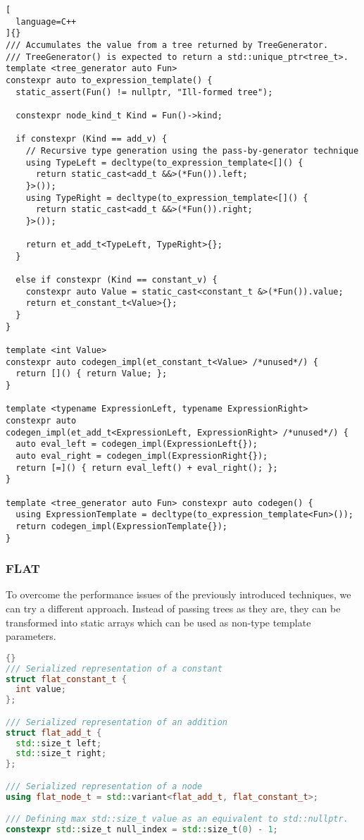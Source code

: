 \documentclass[../main]{subfiles}
\begin{document}
\begin{lstlisting}[
  language=C++
]{}
/// Accumulates the value from a tree returned by TreeGenerator.
/// TreeGenerator() is expected to return a std::unique_ptr<tree_t>.
template <tree_generator auto Fun>
constexpr auto to_expression_template() {
  static_assert(Fun() != nullptr, "Ill-formed tree");

  constexpr node_kind_t Kind = Fun()->kind;

  if constexpr (Kind == add_v) {
    // Recursive type generation using the pass-by-generator technique
    using TypeLeft = decltype(to_expression_template<[]() {
      return static_cast<add_t &&>(*Fun()).left;
    }>());
    using TypeRight = decltype(to_expression_template<[]() {
      return static_cast<add_t &&>(*Fun()).right;
    }>());

    return et_add_t<TypeLeft, TypeRight>{};
  }

  else if constexpr (Kind == constant_v) {
    constexpr auto Value = static_cast<constant_t &>(*Fun()).value;
    return et_constant_t<Value>{};
  }
}

template <int Value>
constexpr auto codegen_impl(et_constant_t<Value> /*unused*/) {
  return []() { return Value; };
}

template <typename ExpressionLeft, typename ExpressionRight>
constexpr auto
codegen_impl(et_add_t<ExpressionLeft, ExpressionRight> /*unused*/) {
  auto eval_left = codegen_impl(ExpressionLeft{});
  auto eval_right = codegen_impl(ExpressionRight{});
  return [=]() { return eval_left() + eval_right(); };
}

template <tree_generator auto Fun> constexpr auto codegen() {
  using ExpressionTemplate = decltype(to_expression_template<Fun>());
  return codegen_impl(ExpressionTemplate{});
}
\end{lstlisting}

\subsubsection{
  FLAT
}

\label{lbl:flat-technique}

To overcome the performance issues of the previously introduced techniques,
we can try a different approach. Instead of passing trees as they are,
they can be transformed into static arrays which can be used as non-type
template parameters.

\begin{lstlisting}[language=C++, label=lst:flat_struct_def]{}
/// Serialized representation of a constant
struct flat_constant_t {
  int value;
};

/// Serialized representation of an addition
struct flat_add_t {
  std::size_t left;
  std::size_t right;
};

/// Serialized representation of a node
using flat_node_t = std::variant<flat_add_t, flat_constant_t>;

/// Defining max std::size_t value as an equivalent to std::nullptr.
constexpr std::size_t null_index = std::size_t(0) - 1;
\end{lstlisting}
\end{document}
